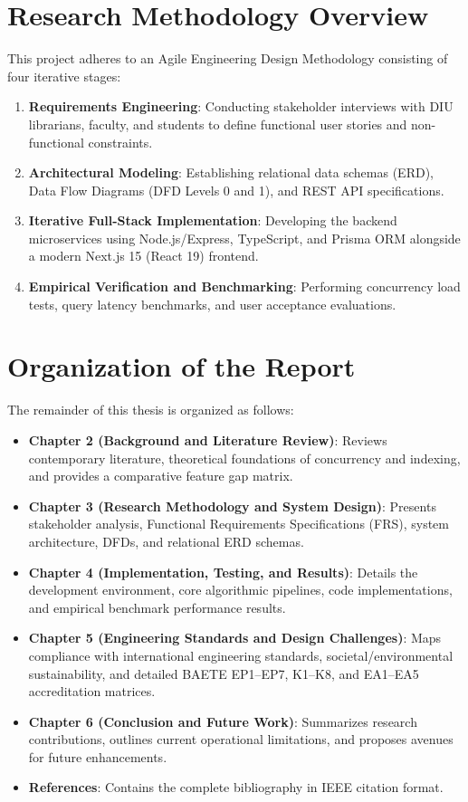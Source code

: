 \section{Research Methodology Overview}
This project adheres to an Agile Engineering Design Methodology consisting of four iterative stages:
\begin{enumerate}
    \item \textbf{Requirements Engineering}: Conducting stakeholder interviews with DIU librarians, faculty, and students to define functional user stories and non-functional constraints.
    \item \textbf{Architectural Modeling}: Establishing relational data schemas (ERD), Data Flow Diagrams (DFD Levels 0 and 1), and REST API specifications.
    \item \textbf{Iterative Full-Stack Implementation}: Developing the backend microservices using Node.js/Express, TypeScript, and Prisma ORM alongside a modern Next.js 15 (React 19) frontend.
    \item \textbf{Empirical Verification and Benchmarking}: Performing concurrency load tests, query latency benchmarks, and user acceptance evaluations.
\end{enumerate}

\section{Organization of the Report}
The remainder of this thesis is organized as follows:
\begin{itemize}
    \item \textbf{Chapter 2 (Background and Literature Review)}: Reviews contemporary literature, theoretical foundations of concurrency and indexing, and provides a comparative feature gap matrix.
    \item \textbf{Chapter 3 (Research Methodology and System Design)}: Presents stakeholder analysis, Functional Requirements Specifications (FRS), system architecture, DFDs, and relational ERD schemas.
    \item \textbf{Chapter 4 (Implementation, Testing, and Results)}: Details the development environment, core algorithmic pipelines, code implementations, and empirical benchmark performance results.
    \item \textbf{Chapter 5 (Engineering Standards and Design Challenges)}: Maps compliance with international engineering standards, societal/environmental sustainability, and detailed BAETE EP1--EP7, K1--K8, and EA1--EA5 accreditation matrices.
    \item \textbf{Chapter 6 (Conclusion and Future Work)}: Summarizes research contributions, outlines current operational limitations, and proposes avenues for future enhancements.
    \item \textbf{References}: Contains the complete bibliography in IEEE citation format.
\end{itemize}
